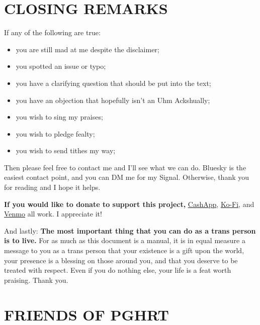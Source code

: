 \documentclass{article}
\begin{document}
{{ 

\section{CLOSING REMARKS}

If any of the following are true:

\begin{itemize}
\item you are still mad at me despite the disclaimer;

\item you spotted an issue or typo;

\item you have a clarifying question that should be put into the text;

\item you have an objection that hopefully isn’t an Uhm Ackshually;

\item you wish to sing my praises;

\item you wish to pledge fealty; 

\item you wish to send tithes my way;
\end{itemize}

Then please feel free to contact me and I’ll see what we can do. Bluesky is the easiest contact point, and you can DM me for my Signal. Otherwise, thank you for reading and I hope it helps.

\textbf{If you would like to donate to support this project,} \href{https://cash.app/Katitties}{CashApp}, \href{https://ko-fi.com/katitties}{Ko-Fi}, and \href{https://account.venmo.com/u/katitties}{Venmo} all work. I appreciate it!

And lastly: \textbf{The most important thing that you can do as a trans person is to live.} For as much as this document is a manual, it is in equal measure a message to you as a trans person that your existence is a gift upon the world, your presence is a blessing on those around you, and that you deserve to be treated with respect. Even if you do nothing else, your life is a feat worth praising. Thank you.



\section*{FRIENDS OF PGHRT}\label{FOPGHRT}

}}
\end{document}

